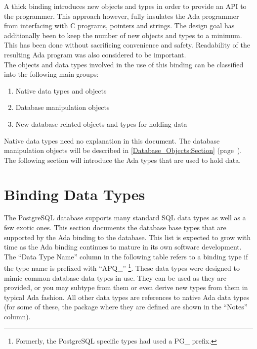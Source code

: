 \documentclass[english,letterpaper]{book}
\newcommand\Ref[1]{\textsection\ref{#1} (page~\pageref{#1})}
\begin{document}
A thick binding introduces new objects and types in order to provide
an API to the programmer. This approach however, fully insulates the
Ada programmer from interfacing with C programs, pointers and strings.
The design goal has additionally been to keep the number of new objects
and types to a minimum. This has been done without sacrificing convenience
and safety. Readability of the resulting Ada program was also considered
to be important.\\

The objects and data types involved in the use of this binding can
be classified into the following main groups:

\begin{enumerate}
   \item Native data types and objects
   \item Database  manipulation objects
   \item New database related objects and types for holding data
\end{enumerate}

Native data types need no explanation in this document. The database
manipulation objects will be described in 
\Ref{Database_Objects:Section}.
The following section will introduce the Ada types that are used to
hold data.


\section{Binding Data Types}

The PostgreSQL database supports many standard SQL data types as well
as a few exotic ones. This section documents the database base types
that are supported by the Ada binding to the database. This list is
expected to grow with time as the Ada binding continues to mature
in its own software development.\\

The ``Data Type Name'' column in the following table refers to
a binding type if the type name is prefixed with ``APQ\_''%
\footnote{Formerly, the PostgreSQL specific types had used a PG\_ prefix.%
}. These data types were designed to mimic common database data types
in use. They can be used as they are provided, or you may subtype
from them or even derive new types from them in typical Ada fashion.
All other data types are references to native Ada data types (for
some of these, the package where they are defined are shown in the
``Notes'' column).\\
\end{document}
